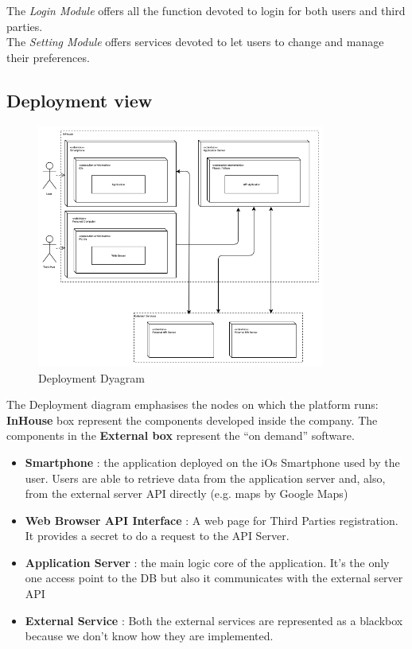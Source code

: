 \documentclass[DD.tex]{subfiles}
\begin{document}
The \textit{Login Module} offers all the function devoted to login for both users and third parties.\\
The \textit{Setting Module} offers services devoted to let users to change and manage their preferences.



\newpage
\subsection{Deployment view}

\begin{figure}[h!]
	\centering
	\includegraphics[height=8.00cm,keepaspectratio]{Figures/DeploymentDiagram}
	\caption{Deployment Dyagram}
\end{figure}

The Deployment diagram emphasises the nodes on which the platform runs:\\
\textbf{InHouse} box represent the components developed inside the company.
The components in the \textbf{External box} represent the “on demand” software.\\
\begin{itemize}
\item	\textbf{Smartphone} : the application deployed on the iOs Smartphone used by the user. Users are able to retrieve data from the application server and, also, from the external 			server API directly (e.g. maps by Google Maps)
\item \textbf{Web Browser API Interface} : A web page for Third Parties registration. It provides a secret to do a request to the API Server.
\item \textbf{Application Server }: the  main logic core of the application. It’s the only one access point to the DB but also it communicates with the external server API
\item  \textbf{External Service} : Both the external services are represented as a blackbox because we don’t know how they are implemented.
\end{itemize}
\newpage
\end{document}
